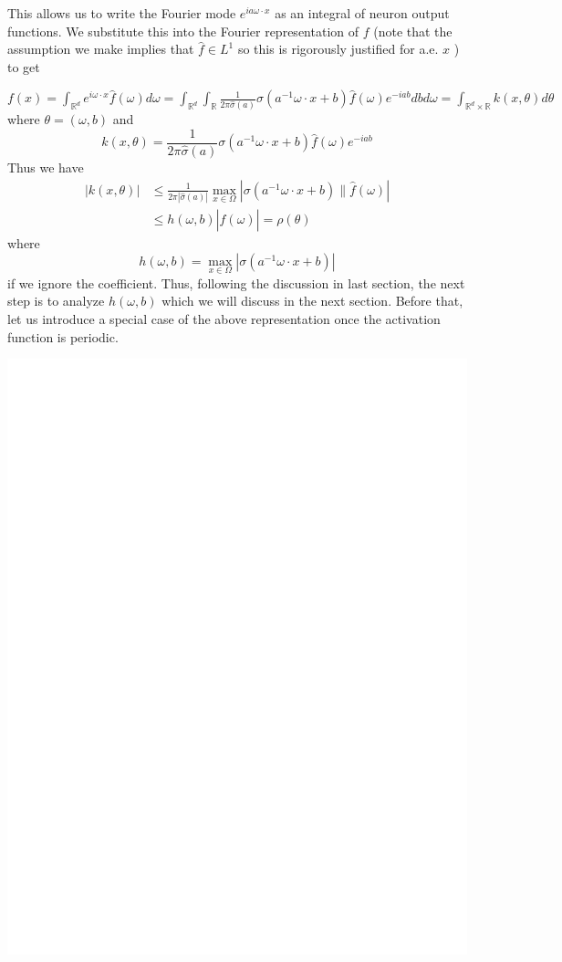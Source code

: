 \documentclass[10pt]{article}
\begin{document}
This allows us to write the Fourier mode $e^{i a \omega \cdot x}$ as an integral of neuron output functions. We substitute this into the Fourier representation of $f$ (note that the assumption we make implies that $\hat{f} \in L^{1}$ so this is rigorously justified for a.e. $x$ ) to get

$f(x)=\int_{\mathbb{R}^{d}} e^{i \omega \cdot x} \hat{f}(\omega) d \omega=\int_{\mathbb{R}^{d}} \int_{\mathbb{R}} \frac{1}{2 \pi \hat{\sigma}(a)} \sigma\left(a^{-1} \omega \cdot x+b\right) \hat{f}(\omega) e^{-i a b} d b d \omega=\int_{\mathbb{R}^{d} \times \mathbb{R}} k(x, \theta) d \theta$ where $\theta=(\omega, b)$ and
$$
k(x, \theta)=\frac{1}{2 \pi \hat{\sigma}(a)} \sigma\left(a^{-1} \omega \cdot x+b\right) \hat{f}(\omega) e^{-i a b}
$$
Thus we have
$$
\begin{aligned}
|k(x, \theta)| & \leq \frac{1}{2 \pi|\hat{\sigma}(a)|} \max _{x \in \Omega}\left|\sigma\left(a^{-1} \omega \cdot x+b\right) \| \hat{f}(\omega)\right| \\
& \leq h(\omega, b)|\hat{f}(\omega)|=\rho(\theta)
\end{aligned}
$$
where
$$
h(\omega, b)=\max _{x \in \Omega}\left|\sigma\left(a^{-1} \omega \cdot x+b\right)\right|
$$
if we ignore the coefficient. Thus, following the discussion in last section, the next step is to analyze $h(\omega, b)$ which we will discuss in the next section. Before that, let us introduce a special case of the above representation once the activation function is periodic.

\includegraphics[max width=\textwidth]{2022_01_05_5a7d88a0a7ec0275e0bbg-12}
\end{document}
